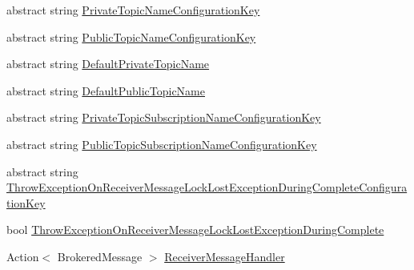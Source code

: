 \begin{DoxyCompactItemize}
\item 
abstract string \hyperlink{classCqrs_1_1Azure_1_1ServiceBus_1_1AzureServiceBus_ad24cd58549bbf6377e692b6ae6843be9}{Private\+Topic\+Name\+Configuration\+Key}
\item 
abstract string \hyperlink{classCqrs_1_1Azure_1_1ServiceBus_1_1AzureServiceBus_aec01ea2e2fb686bb3c9ff04f4d337ed6}{Public\+Topic\+Name\+Configuration\+Key}
\item 
abstract string \hyperlink{classCqrs_1_1Azure_1_1ServiceBus_1_1AzureServiceBus_a1fb185ed8605b1f985e4c108ff906b93}{Default\+Private\+Topic\+Name}
\item 
abstract string \hyperlink{classCqrs_1_1Azure_1_1ServiceBus_1_1AzureServiceBus_a1119f77ee8c51a575217466046f282a9}{Default\+Public\+Topic\+Name}
\item 
abstract string \hyperlink{classCqrs_1_1Azure_1_1ServiceBus_1_1AzureServiceBus_adb82030e0e3ba17347e7fd6a2c68fc91}{Private\+Topic\+Subscription\+Name\+Configuration\+Key}
\item 
abstract string \hyperlink{classCqrs_1_1Azure_1_1ServiceBus_1_1AzureServiceBus_afd2996c47ea248fd1b70ad8077dcd215}{Public\+Topic\+Subscription\+Name\+Configuration\+Key}
\item 
abstract string \hyperlink{classCqrs_1_1Azure_1_1ServiceBus_1_1AzureServiceBus_a29a4fb4d6f85c649e699cd5e7f0b4d1d}{Throw\+Exception\+On\+Receiver\+Message\+Lock\+Lost\+Exception\+During\+Complete\+Configuration\+Key}
\item 
bool \hyperlink{classCqrs_1_1Azure_1_1ServiceBus_1_1AzureServiceBus_afd7c5f3b9caa1ce88bcd8be049bbf099}{Throw\+Exception\+On\+Receiver\+Message\+Lock\+Lost\+Exception\+During\+Complete}
\item 
Action$<$ Brokered\+Message $>$ \hyperlink{classCqrs_1_1Azure_1_1ServiceBus_1_1AzureServiceBus_ab662579a9bd5be761a23f43e739ff288}{Receiver\+Message\+Handler}

\end{DoxyCompactItemize}

